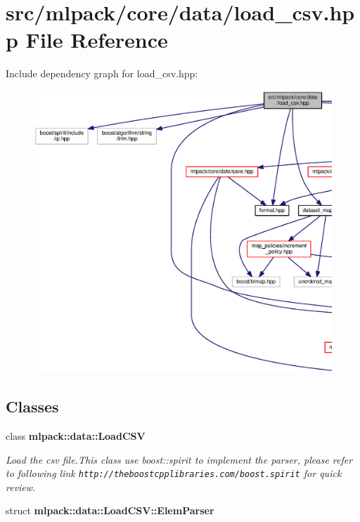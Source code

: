 \section{src/mlpack/core/data/load\+\_\+csv.hpp File Reference}
\label{load__csv_8hpp}
Include dependency graph for load\+\_\+csv.\+hpp\+:
\nopagebreak
\begin{figure}[H]
\begin{center}
\leavevmode
\includegraphics[width=350pt]{load__csv_8hpp__incl}
\end{center}
\end{figure}
\subsection*{Classes}
\begin{DoxyCompactItemize}
\item 
class {\bf mlpack\+::data\+::\+Load\+C\+SV}
\begin{DoxyCompactList}\small\item\em Load the csv file.\+This class use boost\+::spirit to implement the parser, please refer to following link {\tt http\+://theboostcpplibraries.\+com/boost.\+spirit} for quick review. \end{DoxyCompactList}\item 
struct {\bf mlpack\+::data\+::\+Load\+C\+S\+V\+::\+Elem\+Parser}
\end{DoxyCompactItemize}
